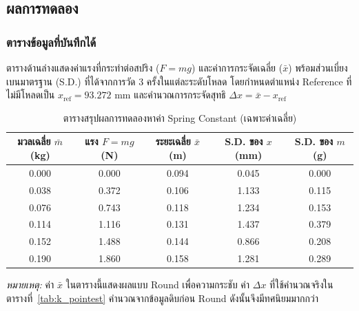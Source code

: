 
\subsection{ผลการทดลอง}

\subsubsection{ตารางข้อมูลที่บันทึกได้}

ตารางด้านล่างแสดงค่าแรงที่กระทำต่อสปริง ($F = mg$) และค่าการกระจัดเฉลี่ย ($\bar{x}$) พร้อมส่วนเบี่ยงเบนมาตรฐาน (S.D.) ที่ได้จากการวัด 3 ครั้งในแต่ละระดับโหลด โดยกำหนดตำแหน่ง Reference ที่ไม่มีโหลดเป็น $x_\text{ref} = 93.272$ mm และคำนวณการกระจัดสุทธิ $\Delta x = \bar{x} - x_\text{ref}$
\begin{table}[ht]
    \centering
    \caption{ตารางสรุปผลการทดลองหาค่า Spring Constant (เฉพาะค่าเฉลี่ย)}
    \label{tab:spring_summary}
    \begin{tabular}{ccccc}
        \hline
        \textbf{มวลเฉลี่ย $\bar{m}$ (kg)} & \textbf{แรง $F=mg$ (N)} & \textbf{ระยะเฉลี่ย $\bar{x}$ (m)} & \textbf{S.D. ของ $x$ (mm)} & \textbf{S.D. ของ $m$ (g)} \\
        \hline
        0.000 & 0.000 & 0.094 & 0.045 & 0.000 \\
        0.038 & 0.372 & 0.106 & 1.133 & 0.115 \\
        0.076 & 0.743 & 0.118 & 1.234 & 0.153 \\
        0.114 & 1.116 & 0.131 & 1.437 & 0.379 \\
        0.152 & 1.488 & 0.144 & 0.866 & 0.208 \\
        0.190 & 1.860 & 0.158 & 1.281 & 0.289 \\
        \hline
    \end{tabular}
        \begin{minipage}{0.85\textwidth}
        \vspace{4pt}
        \footnotesize
        \textit{หมายเหตุ:} ค่า $\bar{x}$ ในตารางนี้แสดงผลแบบ Round เพื่อความกระชับ
        ค่า $\Delta x$ ที่ใช้คำนวณจริงในตารางที่~\ref{tab:k_pointest}
        คำนวณจากข้อมูลดิบก่อน Round ดังนั้นจึงมีทศนิยมมากกว่า
    \end{minipage}
\end{table}

